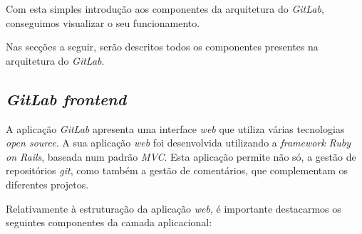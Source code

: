 \documentclass[12pt,a4paper]{article}
\begin{document}
Com esta simples introdução aos componentes da arquitetura do \emph{GitLab}, conseguimos visualizar o seu funcionamento.

Nas secções a seguir, serão descritos todos os componentes presentes na arquitetura do \emph{GitLab}.


\subsection{\emph{GitLab frontend}}

A aplicação \emph{GitLab} apresenta uma interface \emph{web} que utiliza várias tecnologias \emph{open source}. A sua aplicação \emph{web} foi desenvolvida utilizando a \emph{framework} \emph{Ruby on Rails}, baseada num padrão \emph{MVC}. Esta aplicação permite não só, a gestão de repositórios \emph{git}, como também a gestão de comentários, que complementam os diferentes projetos.

Relativamente à estruturação da aplicação \emph{web}, é importante destacarmos os seguintes componentes da camada aplicacional:
\end{document}
